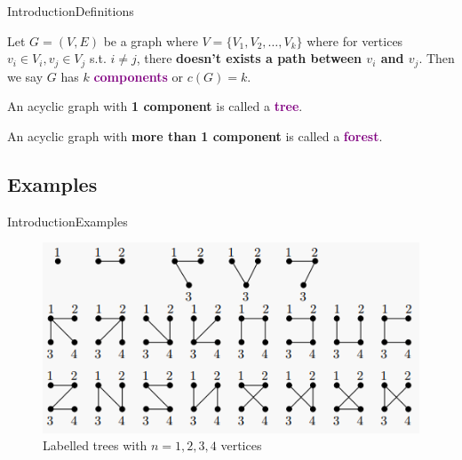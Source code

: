 \documentclass[10pt]{beamer}
\theoremstyle{definition}
\newcommand{\Sone}{Introduction}
\newcommand{\SoneSSdefinitions}{Definitions}
\newcommand{\SoneSSexamples}{Examples}
\newcommand{\DefColor}{purple}
\begin{document}
\begin{frame}{\Sone}{\SoneSSdefinitions}
\begin{definition}
Let $G=(V,E)$ be a graph where $V=\{V_{1}, V_{2}, \ldots, V_{k}\}$ where for vertices $v_{i} \in V_{i},v_{j} \in V_{j}$ s.t. $i\neq j$, there \textbf{doesn't exists a path between $v_{i}$ and $v_{j}$}. Then we say $G$ has $k$ \textbf{\textcolor{\DefColor}{components}} or $c(G)=k$.
\end{definition}

\pause{}

\begin{definition}
An acyclic graph with \textbf{1 component} is called a \textbf{\textcolor{\DefColor}{tree}}.

An acyclic graph with \textbf{more than 1 component} is called a \textbf{\textcolor{\DefColor}{forest}}.
\end{definition}

\end{frame}

\subsection{\SoneSSexamples}
\begin{frame}{\Sone}{\SoneSSexamples}
\begin{figure}
  \includegraphics[width=\linewidth]{images/section1_trees_1_to_4.png}
  \caption{Labelled trees with $n=1,2,3,4$ vertices}
  \label{fig:trees_1_to_4}
\end{figure}

\end{frame}
\end{document}
